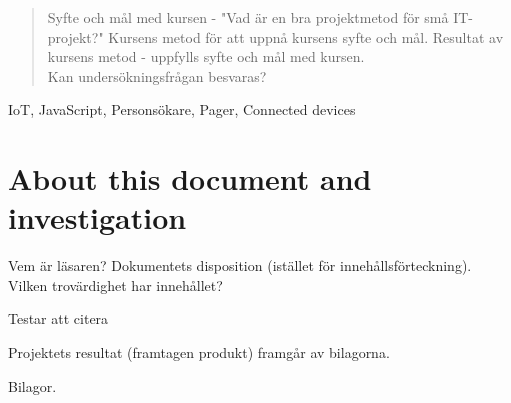 
\begin{abstract}
Syfte och mål med kursen - "Vad är en bra projektmetod för små IT-projekt?" Kursens metod för att uppnå
kursens syfte och mål. Resultat av kursens metod - uppfylls syfte och mål med kursen.\\
Kan undersökningsfrågan besvaras?
\end{abstract}

\begin{IEEEkeywords}
IoT, JavaScript, Personsökare, Pager, Connected devices
\end{IEEEkeywords}

\section{About this document and investigation}
Vem är läsaren? Dokumentets disposition (istället för innehållsförteckning). Vilken trovärdighet har innehållet?

Testar att citera \cite{noauthor_hallbar_nodate}

Projektets resultat (framtagen produkt) framgår av bilagorna.

Bilagor.